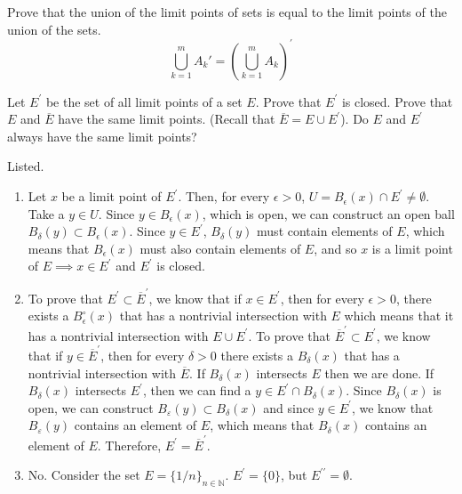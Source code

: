 \documentclass{article}
\begin{document}
    \begin{exercise}
    Prove that the union of the limit points of sets is equal to the limit points of the union of the sets. 
    \[\bigcup_{k=1}^m A_k'=\left(\bigcup_{k=1}^m A_k\right)^{\!\prime}\]
    \end{exercise}

    \begin{exercise}[Rudin 2.6]
    Let $E^\prime$ be the set of all limit points of a set $E$. Prove that $E^\prime$ is closed. Prove that $E$ and $\overline{E}$ have the same limit points. (Recall that $\overline{E} = E \cup E^\prime$). Do $E$ and $E^\prime$ always have the same limit points? 
    \end{exercise}
    \begin{solution}
    Listed. 
    \begin{enumerate}
        \item Let $x$ be a limit point of $E^\prime$. Then, for every $\epsilon > 0$, $U = B_\epsilon (x) \cap E^\prime \neq \emptyset$. Take a $y \in U$. Since $y \in B_\epsilon (x)$, which is open, we can construct an open ball $B_\delta (y) \subset B_\epsilon (x)$. Since $y \in E^\prime$, $B_\delta (y)$ must contain elements of $E$, which means that $B_\epsilon (x)$ must also contain elements of $E$, and so $x$ is a limit point of $E \implies x \in E^\prime$ and $E^\prime$ is closed. 

        \item To prove that $E^\prime \subset \overline{E}^\prime$, we know that if $x \in E^\prime$, then for every $\epsilon > 0$, there exists a $B_\epsilon ^\circ (x)$ that has a nontrivial intersection with $E$ which means that it has a nontrivial intersection with $E \cup E^\prime$. To prove that $\overline{E}^\prime \subset E^\prime$, we know that if $y \in \overline{E}^\prime$, then for every $\delta > 0$ there exists a $B_\delta (x)$ that has a nontrivial intersection with $\overline{E}$. If $B_\delta (x)$ intersects $E$ then we are done. If $B_\delta (x)$ intersects $E^\prime$, then we can find a $y \in E^\prime \cap B_\delta (x)$. Since $B_\delta (x)$ is open, we can construct $B_\varepsilon (y) \subset B_\delta (x)$ and since $y \in E^\prime$, we know that $B_\varepsilon (y)$ contains an element of $E$, which means that $B_\delta (x)$ contains an element of $E$. Therefore, $E^\prime = \overline{E}^\prime$. 

        \item No. Consider the set $E = \{1/n\}_{n \in \mathbb{N}}$. $E^\prime = \{0\}$, but $E^{\prime\prime} = \emptyset$. 
    \end{enumerate}
    \end{solution}
\end{document}
